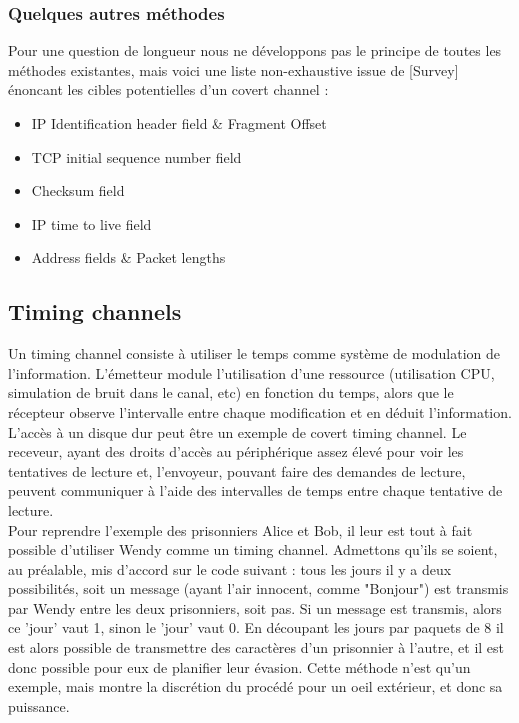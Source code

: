 \documentclass{acm_proc_article-sp}
\begin{document}
\subsubsection{Quelques autres méthodes}
    Pour une question de longueur nous ne développons pas le principe de toutes les méthodes existantes, mais voici une liste non-exhaustive issue de [Survey] énoncant les cibles potentielles d'un covert channel :
    \begin{itemize}
    \item IP Identification header field \& Fragment Offset
    \item TCP initial sequence number field
    \item Checksum field
    \item IP time to live field
    \item Address fields \& Packet lengths
    \end{itemize}

\subsection{Timing channels}
Un timing channel consiste à utiliser le temps comme système de modulation de l'information. L'émetteur module l'utilisation d'une ressource (utilisation CPU, simulation de bruit dans le canal, etc) en fonction du temps, alors que le récepteur observe l'intervalle entre chaque modification et en déduit l'information.
L'accès à un disque dur peut être un exemple de covert timing channel. Le receveur, ayant des droits d'accès au périphérique assez élevé pour voir les tentatives de lecture et, l'envoyeur, pouvant faire des demandes de lecture, peuvent communiquer à l'aide des intervalles de temps entre chaque tentative de lecture.\\
Pour reprendre l'exemple des prisonniers Alice et Bob, il leur est tout à fait possible d'utiliser Wendy comme un timing channel. Admettons qu'ils se soient, au préalable, mis d'accord sur le code suivant : tous les jours il y a deux possibilités, soit un message (ayant l'air innocent, comme "Bonjour") est transmis par Wendy entre les deux prisonniers, soit pas. Si un message est transmis, alors ce 'jour' vaut 1, sinon le 'jour' vaut 0. En découpant les jours par paquets de 8 il est alors possible de transmettre des caractères d'un prisonnier à l'autre, et il est donc possible pour eux de planifier leur évasion.
Cette méthode n'est qu'un exemple, mais montre la discrétion du procédé pour un oeil extérieur, et donc sa puissance.
\end{document}
